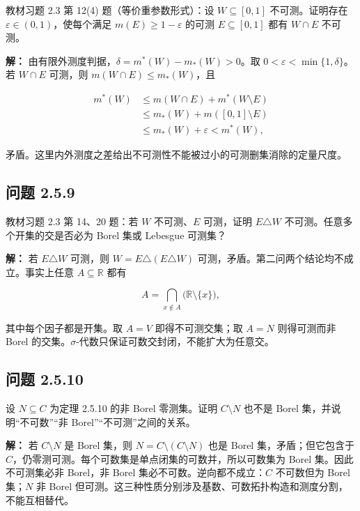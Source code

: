 \documentclass[11pt,a4paper]{article}
\begin{document}
教材习题 2.3 第 12(4) 题（等价重参数形式）：设 \(W\subseteq[0,1]\)
不可测。证明存在 \(\varepsilon\in(0,1)\)，使每个满足
\(m(E)\ge1-\varepsilon\) 的可测 \(E\subseteq[0,1]\) 都有 \(W\cap E\)
不可测。

\textbf{解：} 由有限外测度判据，\(\delta=m^*(W)-m_*(W)>0\)。取
\(0<\varepsilon<\min\{1,\delta\}\)。若 \(W\cap E\) 可测，则
\(m(W\cap E)\le m_*(W)\)，且

\begin{equation*}
\begin{aligned}
m^*(W)&\le m(W\cap E)+m^*(W\setminus E)\\
&\le m_*(W)+m([0,1]\setminus E)\\
&\le m_*(W)+\varepsilon<m^*(W),
\end{aligned}
\end{equation*}

矛盾。这里内外测度之差给出不可测性不能被过小的可测删集消除的定量尺度。

\subsection{问题 2.5.9}\label{ux95eeux9898-2.5.9}

教材习题 2.3 第 14、20 题：若 \(W\) 不可测、\(E\) 可测，证明
\(E\triangle W\) 不可测。任意多个开集的交是否必为 Borel 集或 Lebesgue
可测集？

\textbf{解：} 若 \(E\triangle W\) 可测，则
\(W=E\triangle(E\triangle W)\)
可测，矛盾。第二问两个结论均不成立。事实上任意 \(A\subseteq\mathbb R\)
都有

\begin{equation*}
A=\bigcap_{x\notin A}\bigl(\mathbb R\setminus\{x\}\bigr),
\end{equation*}

其中每个因子都是开集。取 \(A=V\) 即得不可测交集；取 \(A=N\) 则得可测而非
Borel 的交集。\(\sigma\)-代数只保证可数交封闭，不能扩大为任意交。

\subsection{问题 2.5.10}\label{ux95eeux9898-2.5.10}

设 \(N\subseteq C\) 为定理 2.5.10 的非 Borel 零测集。证明
\(C\setminus N\) 也不是 Borel 集，并说明``不可数''``非
Borel''``不可测''之间的关系。

\textbf{解：} 若 \(C\setminus N\) 是 Borel 集，则
\(N=C\setminus(C\setminus N)\) 也是 Borel 集，矛盾；但它包含于
\(C\)，仍零测可测。每个可数集是单点闭集的可数并，所以可数集为 Borel
集。因此不可测集必非 Borel，非 Borel 集必不可数。逆向都不成立：\(C\)
不可数但为 Borel 集；\(N\) 非 Borel
但可测。这三种性质分别涉及基数、可数拓扑构造和测度分割，不能互相替代。
\end{document}
